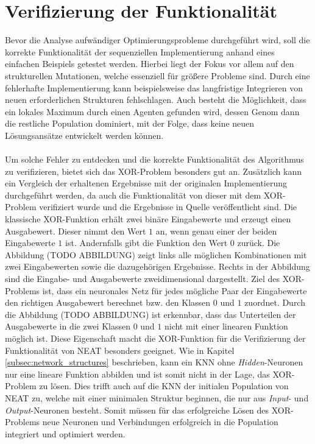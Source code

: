 \section{Verifizierung der Funktionalität}
\label{sec:analysis_valdation_functionality}
Bevor die Analyse aufwändiger Optimierungsprobleme durchgeführt wird, soll die korrekte Funktionalität der sequenziellen Implementierung anhand eines einfachen Beispiels getestet werden. Hierbei liegt der Fokus vor allem auf den strukturellen Mutationen, welche essenziell für größere Probleme sind. Durch eine fehlerhafte Implementierung kann beispielsweise das langfristige Integrieren von neuen erforderlichen Strukturen fehlschlagen. Auch besteht die Möglichkeit, dass ein lokales Maximum durch einen Agenten gefunden wird, dessen Genom dann die restliche Population dominiert, mit der Folge, dass keine neuen Lösungsansätze entwickelt werden können.
\\\\
Um solche Fehler zu entdecken und die korrekte Funktionalität des Algorithmus zu verifizieren, bietet sich das XOR-Problem besonders gut an. Zusätzlich kann ein Vergleich der erhaltenen Ergebnisse mit der originalen Implementierung durchgeführt werden, da auch die Funktionalität von dieser mit dem XOR-Problem verifiziert wurde und die Ergebnisse in Quelle \cite{stanley2002evolving} veröffentlicht sind. Die klassische XOR-Funktion erhält zwei binäre Eingabewerte und erzeugt einen Ausgabewert. Dieser nimmt den Wert $1$ an, wenn genau einer der beiden Eingabewerte $1$ ist. Andernfalls gibt die Funktion den Wert $0$ zurück. Die Abbildung (TODO ABBILDUNG) zeigt links alle möglichen Kombinationen mit zwei Eingabewerten sowie die dazugehörigen Ergebnisse. Rechts in der Abbildung sind die Eingabe- und Ausgabewerte zweidimensional dargestellt. Ziel des XOR-Problems ist, dass ein neuronales Netz für jedes mögliche Paar der Eingabewerte den richtigen Ausgabewert berechnet bzw. den Klassen $0$ und $1$ zuordnet. Durch die Abbildung (TODO ABBILDUNG) ist erkennbar, dass das Unterteilen der Ausgabewerte in die zwei Klassen $0$ und $1$ nicht mit einer linearen Funktion möglich ist. Diese Eigenschaft macht die XOR-Funktion für die Verifizierung der Funktionalität von \ac{NEAT} besonders geeignet. Wie in Kapitel \ref{subsec:network_structures} beschrieben, kann ein \ac{KNN} ohne \emph{Hidden}-Neuronen nur eine lineare Funktion abbilden und ist somit nicht in der Lage, das XOR-Problem zu lösen. Dies trifft auch auf die \ac{KNN} der initialen Population von \ac{NEAT} zu, welche mit einer minimalen Struktur beginnen, die nur aus \emph{Input}- und \emph{Output}-Neuronen besteht. Somit müssen für das erfolgreiche Lösen des XOR-Problems neue Neuronen und Verbindungen erfolgreich in die Population integriert und optimiert werden. 

